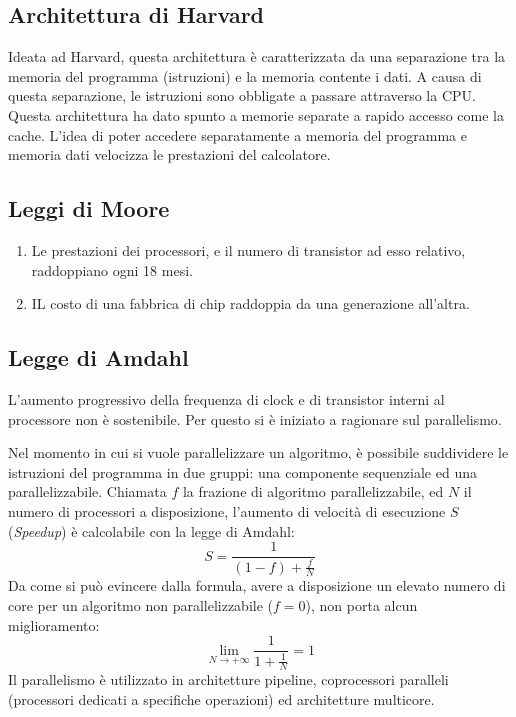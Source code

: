 \documentclass[../ace.tex]{subfiles}
\begin{document}
\subsection{Architettura di Harvard} \label{sec:architettura_harvard}
\begin{figure}[h]
    \centering
\end{figure}

\noindent
Ideata ad Harvard, questa architettura è caratterizzata da una separazione tra la memoria del programma (istruzioni) e la memoria contente i dati.
A causa di questa separazione, le istruzioni sono obbligate a passare attraverso la CPU.
Questa architettura ha dato spunto a memorie separate a rapido accesso come la cache.
L'idea di poter accedere separatamente a memoria del programma e memoria dati velocizza le prestazioni del calcolatore.

\subsection{Leggi di Moore}
\begin{enumerate}
    \item Le prestazioni dei processori, e il numero di transistor ad esso relativo, raddoppiano ogni 18 mesi.
    \item IL costo di una fabbrica di chip raddoppia da una generazione all'altra.
\end{enumerate}

\subsection{Legge di Amdahl}
L'aumento progressivo della frequenza di clock e di transistor interni al processore non è sostenibile.
Per questo si è iniziato a ragionare sul parallelismo.

Nel momento in cui si vuole parallelizzare un algoritmo, è possibile suddividere le istruzioni del programma in due gruppi: una componente sequenziale ed una parallelizzabile.
Chiamata $f$ la frazione di algoritmo parallelizzabile, ed $N$ il numero di processori a disposizione, l'aumento di
velocità di esecuzione $S$ (\textit{Speedup}) è calcolabile con la legge di Amdahl:
\[
    S = \frac{1}{(1 - f) + \frac{f}{N}}
\]
Da come si può evincere dalla formula, avere a disposizione un elevato numero di core per un algoritmo non parallelizzabile ($f = 0$), non porta alcun miglioramento:
\[
    \lim_{N \to +\infty} \frac{1}{1 + \frac{1}{N}} = 1
\]
Il parallelismo è  utilizzato in architetture pipeline, coprocessori paralleli (processori dedicati a specifiche operazioni) ed architetture multicore.
\end{document}
